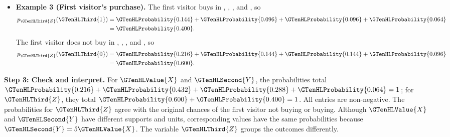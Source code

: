 \begin{itemize}
	\item \textbf{Example 3 (First visitor's purchase).}
	The first visitor buys in , , , and , so
	\[
	\begin{aligned}
		p_{\GTenHLThird{Z}}(\GTenHLThird{1})
		&=\GTenHLProbability{0.144}+\GTenHLProbability{0.096}+\GTenHLProbability{0.096}+\GTenHLProbability{0.064}\\
		&=\GTenHLProbability{0.400}.
	\end{aligned}
	\]
	The first visitor does not buy in , , ,
	and , so
	\[
	\begin{aligned}
		p_{\GTenHLThird{Z}}(\GTenHLThird{0})
		&=\GTenHLProbability{0.216}+\GTenHLProbability{0.144}+\GTenHLProbability{0.144}+\GTenHLProbability{0.096}\\
		&=\GTenHLProbability{0.600}.
	\end{aligned}
	\]
\end{itemize}

\textbf{Step 3: Check and interpret.} For $\GTenHLValue{X}$ and $\GTenHLSecond{Y}$, the probabilities total $\GTenHLProbability{0.216}+\GTenHLProbability{0.432}+\GTenHLProbability{0.288}+\GTenHLProbability{0.064}=1$; for $\GTenHLThird{Z}$, they total $\GTenHLProbability{0.600}+\GTenHLProbability{0.400}=1$. All entries are non-negative. The probabilities for $\GTenHLThird{Z}$ agree with the original chances of the first visitor not buying or buying. Although $\GTenHLValue{X}$ and $\GTenHLSecond{Y}$ have different supports and units, corresponding values have the same probabilities because $\GTenHLSecond{Y}=5\GTenHLValue{X}$. The variable $\GTenHLThird{Z}$ groups the outcomes differently.


